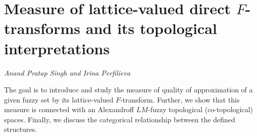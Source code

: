 \documentclass[../booklet.tex]{subfiles}
\begin{document}
\section[Measure of lattice-valued direct $F$-transforms and its topological interpretations. {\it Anand Pratap Singh and Irina Perfilieva}]{Measure of lattice-valued direct $F$-transforms and its topological interpretations}
 

\begin{center}
  {\it Anand Pratap Singh and Irina Perfilieva}
\end{center}

\vskip 0.8cm


		The goal is to introduce and study the measure of quality of approximation of a given fuzzy set by its lattice-valued $F$-transform. Further, we show that this measure is connected with an Alexandroff $LM$-fuzzy topological (co-topological) spaces. Finally, we discuss the categorical relationship between the defined structures.
		
	
\end{document}
